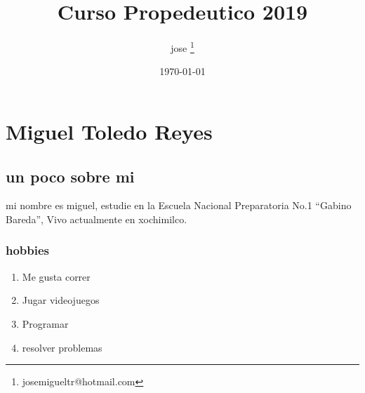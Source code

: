 

\author{jose  \thanks{josemigueltr@hotmail.com}}
\title{ Curso Propedeutico 2019 }
\date{\today}


\maketitle
\tableofcontents
{}



\chapter{Miguel Toledo Reyes}


\section{un poco sobre mi}
 mi nombre es miguel, estudie en la Escuela Nacional Preparatoria No.1 ``Gabino Bareda'', Vivo actualmente en xochimilco.

\subsection{hobbies}
\begin{enumerate}
\item   Me gusta correr
\item   Jugar videojuegos
\item   Programar
\item   resolver problemas
 \end{enumerate}


